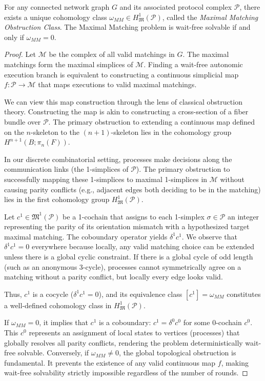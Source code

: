 \begin{lemma}
For any connected network graph $G$ and its associated protocol complex $\mathcal{P}$, there exists a unique cohomology class $\omega_{MM} \in H^1_{\mathfrak{M}}(\mathcal{P})$, called the \textit{Maximal Matching Obstruction Class}. The Maximal Matching problem is wait-free solvable if and only if $\omega_{MM} = 0$.
\end{lemma}

\begin{proof}
Let $\mathcal{M}$ be the complex of all valid matchings in $G$. The maximal matchings form the maximal simplices of $\mathcal{M}$. Finding a wait-free autonomic execution branch is equivalent to constructing a continuous simplicial map $f: \mathcal{P} \to \mathcal{M}$ that maps executions to valid maximal matchings.

We can view this map construction through the lens of classical obstruction theory. Constructing the map is akin to constructing a cross-section of a fiber bundle over $\mathcal{P}$. The primary obstruction to extending a continuous map defined on the $n$-skeleton to the $(n+1)$-skeleton lies in the cohomology group $H^{n+1}(B; \pi_n(F))$. 

In our discrete combinatorial setting, processes make decisions along the communication links (the 1-simplices of $\mathcal{P}$). The primary obstruction to successfully mapping these 1-simplices to maximal 1-simplices in $\mathcal{M}$ without causing parity conflicts (e.g., adjacent edges both deciding to be in the matching) lies in the first cohomology group $H^1_{\mathfrak{M}}(\mathcal{P})$.

Let $c^1 \in \mathfrak{M}^1(\mathcal{P})$ be a 1-cochain that assigns to each 1-simplex $\sigma \in \mathcal{P}$ an integer representing the parity of its orientation mismatch with a hypothesized target maximal matching. The coboundary operator yields $\delta^1 c^1$. We observe that $\delta^1 c^1 = 0$ everywhere because locally, any valid matching choice can be extended unless there is a global cyclic constraint. If there is a global cycle of odd length (such as an anonymous 3-cycle), processes cannot symmetrically agree on a matching without a parity conflict, but locally every edge looks valid.

Thus, $c^1$ is a cocycle ($\delta^1 c^1 = 0$), and its equivalence class $[c^1] = \omega_{MM}$ constitutes a well-defined cohomology class in $H^1_{\mathfrak{M}}(\mathcal{P})$. 

If $\omega_{MM} = 0$, it implies that $c^1$ is a coboundary: $c^1 = \delta^0 c^0$ for some 0-cochain $c^0$. This $c^0$ represents an assignment of local states to vertices (processes) that globally resolves all parity conflicts, rendering the problem deterministically wait-free solvable. 
Conversely, if $\omega_{MM} \neq 0$, the global topological obstruction is fundamental. It prevents the existence of any valid continuous map $f$, making wait-free solvability strictly impossible regardless of the number of rounds.
\end{proof}

